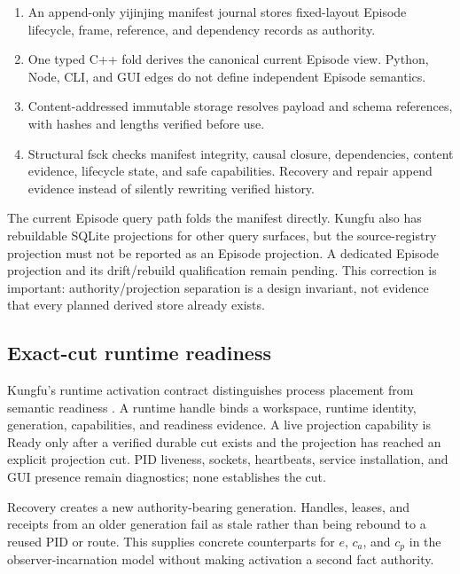 \begin{enumerate}[leftmargin=*]
  \item An append-only yijinjing manifest journal stores fixed-layout Episode
        lifecycle, frame, reference, and dependency records as authority.
  \item One typed C++ fold derives the canonical current Episode view. Python,
        Node, CLI, and GUI edges do not define independent Episode semantics.
  \item Content-addressed immutable storage resolves payload and schema
        references, with hashes and lengths verified before use.
  \item Structural fsck checks manifest integrity, causal closure, dependencies,
        content evidence, lifecycle state, and safe capabilities. Recovery and
        repair append evidence instead of silently rewriting verified history.
\end{enumerate}

The current Episode query path folds the manifest directly. Kungfu also has
rebuildable SQLite projections for other query surfaces, but the source-registry
projection must not be reported as an Episode projection. A dedicated Episode
projection and its drift/rebuild qualification remain pending. This correction
is important: authority/projection separation is a design invariant, not
evidence that every planned derived store already exists.

\subsection{Exact-cut runtime readiness}

Kungfu's runtime activation contract distinguishes process placement from
semantic readiness \cite{kungfu2026activation}. A runtime handle binds a
workspace, runtime identity, generation, capabilities, and readiness evidence.
A live projection capability is Ready only after a verified durable cut exists
and the projection has reached an explicit projection cut. PID liveness,
sockets, heartbeats, service installation, and GUI presence remain diagnostics;
none establishes the cut.

Recovery creates a new authority-bearing generation. Handles, leases, and
receipts from an older generation fail as stale rather than being rebound to a
reused PID or route. This supplies concrete counterparts for $e$, $c_a$, and
$c_p$ in the observer-incarnation model without making activation a second fact
authority.

